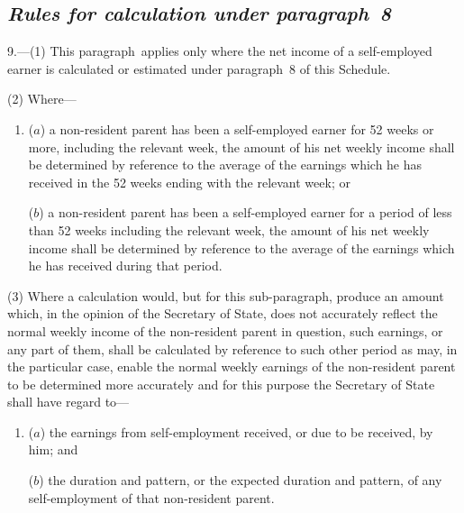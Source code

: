 \documentclass[12pt,a4paper]{article}
\begin{document}

\subsection*{\itshape Rules for calculation under paragraph~8}

9.---(1)  This paragraph~applies only where the net income of a self-employed earner is calculated or estimated under paragraph~8 of this Schedule.

(2) Where—
\begin{enumerate}\item[]
($a$) a non-resident parent has been a self-employed earner for 52 weeks or more, including the relevant week, the amount of his net weekly income shall be determined by reference to the average of the earnings which he has received in the 52 weeks ending with the relevant week; or

($b$) a non-resident parent has been a self-employed earner for a period of less than 52 weeks including the relevant week, the amount of his net weekly income shall be determined by reference to the average of the earnings which he has received during that period.
\end{enumerate}

(3) Where a calculation would, but for this sub-paragraph, produce an amount which, in the opinion of the Secretary of State, does not accurately reflect the normal weekly income of the non-resident parent in question, such earnings, or any part of them, shall be calculated by reference to such other period as may, in the particular case, enable the normal weekly earnings of the non-resident parent to be determined more accurately and for this purpose the Secretary of State shall have regard to—
\begin{enumerate}\item[]
($a$) the earnings from self-employment received, or due to be received, by him; and

($b$) the duration and pattern, or the expected duration and pattern, of any self-employment of that non-resident parent.
\end{enumerate}

\end{document}
